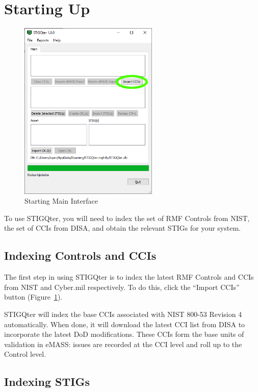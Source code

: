 \documentclass[letterpaper, 10pt, twoside]{article}
\begin{document}
\section{Starting Up}
\begin{figure}
	\centering
	\vspace{-70pt}
	\includegraphics[width=0.59\textwidth]{images/main-01.png}
	\caption{Starting Main Interface}
	\vspace{-10pt}
	\label{fig:importccis}
\end{figure}
To use STIGQter, you will need to index the set of RMF Controls from NIST, the set of CCIs from DISA, and obtain the relevant STIGs for your system.

\subsection{Indexing Controls and CCIs}
The first step in using STIGQter is to index the latest RMF Controls and CCIs from NIST and Cyber.mil respectively. To do this, click the ``Import CCIs'' button (Figure~\ref{fig:importccis}).

STIGQter will index the base CCIs associated with NIST 800-53 Revision 4 automatically. When done, it will download the latest CCI list from DISA to incorporate the latest DoD modifications. These CCIs form the base units of validation in eMASS: issues are recorded at the CCI level and roll up to the Control level.

\subsection{Indexing STIGs}
\end{document}
